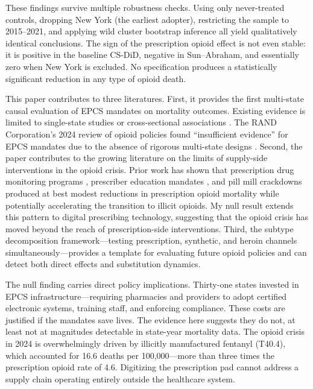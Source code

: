 \documentclass[12pt]{article}
\begin{document}
These findings survive multiple robustness checks. Using only never-treated controls, dropping New York (the earliest adopter), restricting the sample to 2015--2021, and applying wild cluster bootstrap inference all yield qualitatively identical conclusions. The sign of the prescription opioid effect is not even stable: it is positive in the baseline CS-DiD, negative in Sun--Abraham, and essentially zero when New York is excluded. No specification produces a statistically significant reduction in any type of opioid death.

This paper contributes to three literatures. First, it provides the first multi-state causal evaluation of EPCS mandates on mortality outcomes. Existing evidence is limited to single-state studies \citep{thomas2020} or cross-sectional associations \citep{wen2019}. The RAND Corporation's 2024 review of opioid policies found ``insufficient evidence'' for EPCS mandates due to the absence of rigorous multi-state designs \citep{rand2024}. Second, the paper contributes to the growing literature on the limits of supply-side interventions in the opioid crisis. Prior work has shown that prescription drug monitoring programs \citep{buchmueller2018, kilby2024}, prescriber education mandates \citep{meara2016}, and pill mill crackdowns \citep{alpert2022} produced at best modest reductions in prescription opioid mortality while potentially accelerating the transition to illicit opioids. My null result extends this pattern to digital prescribing technology, suggesting that the opioid crisis has moved beyond the reach of prescription-side interventions. Third, the subtype decomposition framework---testing prescription, synthetic, and heroin channels simultaneously---provides a template for evaluating future opioid policies and can detect both direct effects and substitution dynamics.

The null finding carries direct policy implications.
Thirty-one states invested in EPCS infrastructure---requiring pharmacies and providers to adopt certified electronic systems, training staff, and enforcing compliance. These costs are justified if the mandates save lives. The evidence here suggests they do not, at least not at magnitudes detectable in state-year mortality data. The opioid crisis in 2024 is overwhelmingly driven by illicitly manufactured fentanyl (T40.4), which accounted for 16.6 deaths per 100,000---more than three times the prescription opioid rate of 4.6. Digitizing the prescription pad cannot address a supply chain operating entirely outside the healthcare system.
\end{document}
